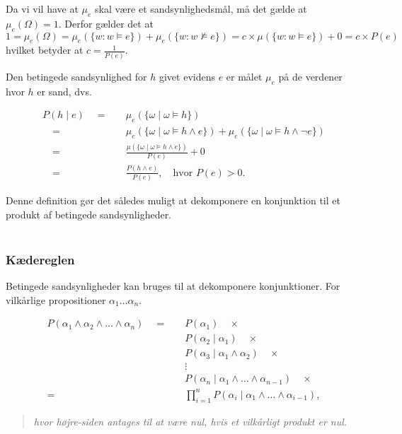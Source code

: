 Da vi vil have at $\mu_e$ skal være et sandsynlighedsmål, må det gælde at $\mu_e(\Omega) = 1$.
Derfor gælder det at $1 = \mu_e(\Omega) = \mu_e(\{ w : w \models e \}) + \mu_e(\{ w : w \not\models e \}) = c \times \mu(\{ w : w \models e\}) + 0 = c \times P(e)$
hvilket betyder at $c = \frac{1}{P(e)}$.

Den betingede sandsynlighed for $h$ givet evidens $e$ er målet $\mu_e$ på de verdener hvor $h$ er sand, dvs.

\begin{align*}
P(h \mid e) \quad = \quad & \mu_e(\{\omega \mid \omega \models h \})\\
\quad = \quad & \mu_e(\{\omega \mid \omega \models h \wedge e \}) + \mu_e(\{\omega \mid \omega \models h \wedge \neg e \})\\
\quad = \quad & \frac{\mu(\{\omega \mid \omega \models h \wedge e \})}{P(e)} + 0\\
\quad = \quad & \frac{P(h \wedge e)}{P(e)}, \quad \textrm{hvor $P(e) > 0$.}
\end{align*}

Denne definition gør det således muligt at dekomponere en konjunktion til et produkt af betingede sandsynligheder. \\ \\
\cite[s. 226-227]{ArtificialIntelligence}

\subsubsection{Kædereglen}

Betingede sandsynligheder kan bruges til at dekomponere konjunktioner.
For vilkårlige propositioner $\alpha_1 \ldots \alpha_n$.

\begin{align*}
P(\alpha_1 \wedge \alpha_2 \wedge \ldots \wedge \alpha_n) \quad = \quad & P(\alpha_1) \quad \times\\
& P(\alpha_2 \mid \alpha_1) \quad \times\\
& P(\alpha_3 \mid \alpha_1 \wedge \alpha_2) \quad \times\\
& \vdots \\
& P(\alpha_n \mid \alpha_1 \wedge \dots \wedge \alpha_{n-1}) \quad \times\\
= \quad &\prod_{i = 1}^{n} P(\alpha_i \mid \alpha_1 \wedge \dots \wedge \alpha_{i-1}),
\end{align*}
\begin{quotation}
	\textit{hvor højre-siden antages til at være nul, hvis et vilkårligt produkt er nul.}
\end{quotation}

